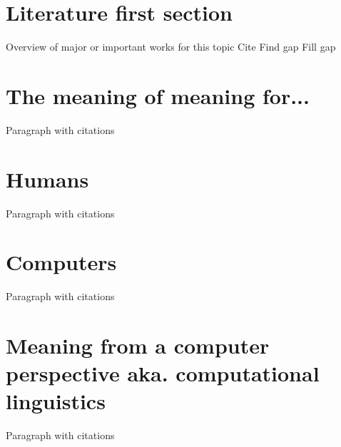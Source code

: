 \section{Literature first section}
Overview of major or important works for this topic
Cite
Find gap
Fill gap
\section{The meaning of meaning for...}
Paragraph with citations


\section{Humans}
Paragraph with citations


\section{Computers}
Paragraph with citations


\section{Meaning from a computer perspective aka. computational linguistics}
Paragraph with citations

